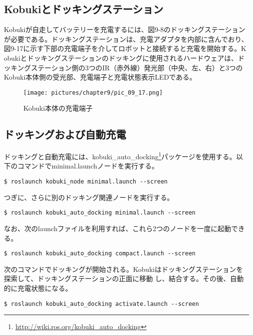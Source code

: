 \begin{itemize}
  \subsection{Kobukiとドッキングステーション}

Kobukiが自走してバッテリーを充電するには、図9-8のドッキングステーションが必要である。ドッキングステーションは、充電アダプタを内部に含んでおり、図9-17に示す下部の充電端子を介してロボットと接続すると充電を開始する。K obukiとドッキングステーションのドッキングに使用されるハードウェアは、ドッキングステーション側の3つのIR（赤外線）発光部（中央、左、右）と3つのKobuki本体側の受光部、充電端子と充電状態表示LEDである。

\begin{figure}[htp]
  \centering
  \texttt{[image: pictures/chapter9/pic\_09\_17.png]}
  \caption{Kobuki本体の充電端子}
\end{figure}

\subsection{ドッキングおよび自動充電}

ドッキングと自動充電には、kobuki\_auto\_docking\footnote{\url{http://wiki.ros.org/kobuki\_auto\_docking}}パッケージを使用する。以下のコマンドでminimal.launchノードを実行する。

\begin{lstlisting}[language=ROS]
$ roslaunch kobuki_node minimal.launch --screen
\end{lstlisting}

つぎに、さらに別のドッキング関連ノードを実行する。

\begin{lstlisting}[language=ROS]
$ roslaunch kobuki_auto_docking minimal.launch --screen
\end{lstlisting}

なお、次のlaunchファイルを利用すれば、これら2つのノードを一度に起動できる。

\begin{lstlisting}[language=ROS]
$ roslaunch kobuki_auto_docking compact.launch --screen
\end{lstlisting}

次のコマンドでドッキングが開始される。Kobukiはドッキングステーションを探索して、ドッキングステーションの正面に移動  し、結合する。その後、自動的に充電状態になる。

\begin{lstlisting}[language=ROS]
$ roslaunch kobuki_auto_docking activate.launch --screen
\end{lstlisting}


\end{itemize}
